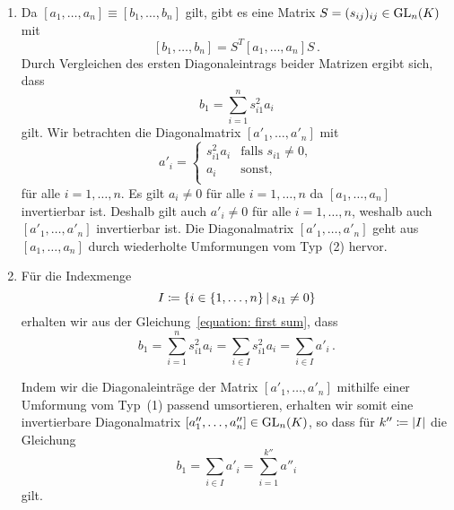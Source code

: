 \documentclass[a4paper,10pt,numbers = noenddot]{scrartcl}
\begin{document}
\begin{enumerate}[label = \arabic*)]
  \item
    Da $[a_1, \dotsc, a_n] \equiv [b_1, \dotsc, b_n]$ gilt, gibt es eine Matrix $S = (s_{ij})_{ij} \in \operatorname{GL}_{n}(K)$ mit
    \[
      [b_1, \dotsc, b_n] = S^T [a_1, \dotsc, a_n] S \,.
    \]
    Durch Vergleichen des ersten Diagonaleintrags beider Matrizen ergibt sich, dass
    \begin{equation}
      \label{equation: first sum}
      b_1 = \sum_{i=1}^n s_{i1}^2 a_i
    \end{equation}
    gilt.
    Wir betrachten die Diagonalmatrix $[a'_1, \dotsc, a'_n]$ mit
    \[
        a'_{i}
      = \begin{cases}
          s_{i1}^2 a_i  & \text{falls $s_{i1} \neq 0$}, \\
          a_i           & \text{sonst},                 \\
        \end{cases}
    \]
    für alle $i = 1, \dotsc, n$.
    Es gilt $a_i \neq 0$ für alle $i = 1, \dotsc, n$ da $[a_1, \dotsc, a_n]$ invertierbar ist.
    Deshalb gilt auch $a'_i \neq 0$ für alle $i = 1, \dotsc, n$, weshalb auch $[a'_1, \dotsc, a'_n]$ invertierbar ist.
    Die Diagonalmatrix $[a'_1, \dotsc, a'_n]$ geht aus $[a_1, \dotsc, a_n]$ durch wiederholte Umformungen vom Typ~(2) hervor.
    
  \item
    Für die Indexmenge
    \[
                I
      \defined  \{ i \in \{1, \dotsc, n\} \suchthat s_{i1} \neq 0 \}
    \]
    erhalten wir aus der Gleichung~\eqref{equation: first sum}, dass 
    \[
        b_1
      = \sum_{i=1}^n s_{i1}^2 a_i
      = \sum_{i \in I} s_{i1}^2 a_i
      = \sum_{i \in I} a'_i \,.
    \]
    
    Indem wir die Diagonaleinträge der Matrix $[a'_1, \dotsc, a'_n]$ mithilfe einer Umformung vom Typ~(1) passend umsortieren, erhalten wir somit eine invertierbare Diagonalmatrix $[a''_1, \dotsc, a''_n] \in \operatorname{GL}_{n}(K)$, so dass für $k'' \coloneqq |I|$ die Gleichung
    \[
        b_1
      = \sum_{i \in I} a'_i
      = \sum_{i=1}^{k''} a''_i
    \]
    gilt.
    

\end{enumerate}
\end{document}
